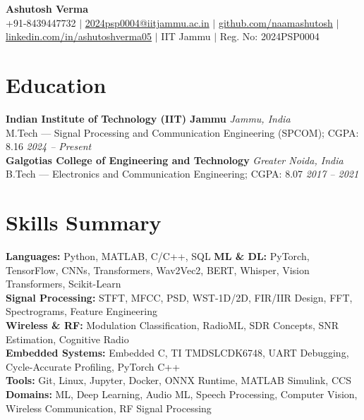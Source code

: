 \documentclass[9.5pt, letterpaper]{article}
\begin{document}
\begin{center}
  {\large\textbf{Ashutosh Verma}}\\[0.5pt]
  \scriptsize
  +91-8439447732 $|$
  \href{mailto:2024psp0004@iitjammu.ac.in}{2024psp0004@iitjammu.ac.in} $|$
  \href{https://github.com/naamashutosh}{github.com/naamashutosh} $|$
  \href{https://linkedin.com/in/ashutoshverma05}{linkedin.com/in/ashutoshverma05} $|$
  IIT Jammu $|$ Reg. No: 2024PSP0004
\end{center}

\section{Education}
\textbf{Indian Institute of Technology (IIT) Jammu} \hfill \textit{Jammu, India}\\
M.Tech --- Signal Processing and Communication Engineering (SPCOM); CGPA: 8.16 \hfill \textit{2024 -- Present}\\[4pt]
\textbf{Galgotias College of Engineering and Technology} \hfill \textit{Greater Noida, India}\\
B.Tech --- Electronics and Communication Engineering; CGPA: 8.07 \hfill \textit{2017 -- 2021}

\section{Skills Summary}
\textbf{Languages:} Python, MATLAB, C/C++, SQL \hspace{0.5em}
\textbf{ML \& DL:} PyTorch, TensorFlow, CNNs, Transformers, Wav2Vec2, BERT, Whisper, Vision Transformers, Scikit-Learn\\[2pt]
\textbf{Signal Processing:} STFT, MFCC, PSD, WST-1D/2D, FIR/IIR Design, FFT, Spectrograms, Feature Engineering\\[2pt]
\textbf{Wireless \& RF:} Modulation Classification, RadioML, SDR Concepts, SNR Estimation, Cognitive Radio\\[2pt]
\textbf{Embedded Systems:} Embedded C, TI TMDSLCDK6748, UART Debugging, Cycle-Accurate Profiling, PyTorch C++\\[2pt]
\textbf{Tools:} Git, Linux, Jupyter, Docker, ONNX Runtime, MATLAB Simulink, CCS \hspace{0.5em}
\textbf{Domains:} ML, Deep Learning, Audio ML, Speech Processing, Computer Vision, Wireless Communication, RF Signal Processing

\end{document}
